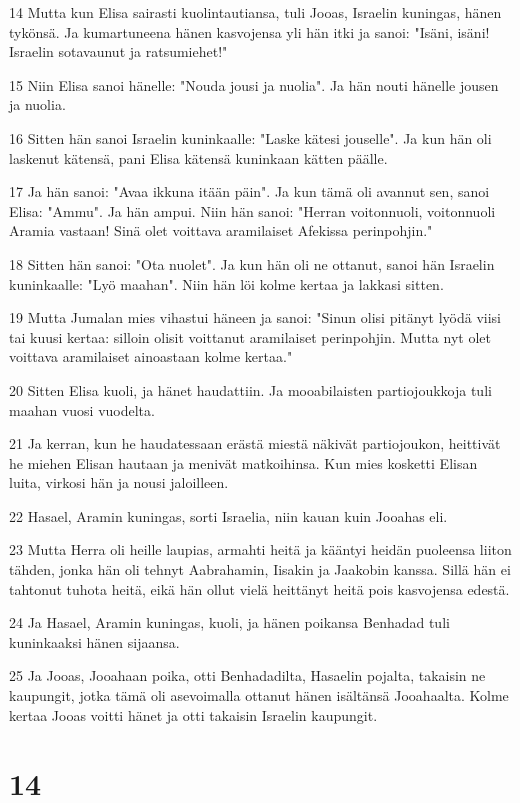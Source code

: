 \par 14 Mutta kun Elisa sairasti kuolintautiansa, tuli Jooas, Israelin kuningas, hänen tykönsä. Ja kumartuneena hänen kasvojensa yli hän itki ja sanoi: "Isäni, isäni! Israelin sotavaunut ja ratsumiehet!"
\par 15 Niin Elisa sanoi hänelle: "Nouda jousi ja nuolia". Ja hän nouti hänelle jousen ja nuolia.
\par 16 Sitten hän sanoi Israelin kuninkaalle: "Laske kätesi jouselle". Ja kun hän oli laskenut kätensä, pani Elisa kätensä kuninkaan kätten päälle.
\par 17 Ja hän sanoi: "Avaa ikkuna itään päin". Ja kun tämä oli avannut sen, sanoi Elisa: "Ammu". Ja hän ampui. Niin hän sanoi: "Herran voitonnuoli, voitonnuoli Aramia vastaan! Sinä olet voittava aramilaiset Afekissa perinpohjin."
\par 18 Sitten hän sanoi: "Ota nuolet". Ja kun hän oli ne ottanut, sanoi hän Israelin kuninkaalle: "Lyö maahan". Niin hän löi kolme kertaa ja lakkasi sitten.
\par 19 Mutta Jumalan mies vihastui häneen ja sanoi: "Sinun olisi pitänyt lyödä viisi tai kuusi kertaa: silloin olisit voittanut aramilaiset perinpohjin. Mutta nyt olet voittava aramilaiset ainoastaan kolme kertaa."
\par 20 Sitten Elisa kuoli, ja hänet haudattiin. Ja mooabilaisten partiojoukkoja tuli maahan vuosi vuodelta.
\par 21 Ja kerran, kun he haudatessaan erästä miestä näkivät partiojoukon, heittivät he miehen Elisan hautaan ja menivät matkoihinsa. Kun mies kosketti Elisan luita, virkosi hän ja nousi jaloilleen.
\par 22 Hasael, Aramin kuningas, sorti Israelia, niin kauan kuin Jooahas eli.
\par 23 Mutta Herra oli heille laupias, armahti heitä ja kääntyi heidän puoleensa liiton tähden, jonka hän oli tehnyt Aabrahamin, Iisakin ja Jaakobin kanssa. Sillä hän ei tahtonut tuhota heitä, eikä hän ollut vielä heittänyt heitä pois kasvojensa edestä.
\par 24 Ja Hasael, Aramin kuningas, kuoli, ja hänen poikansa Benhadad tuli kuninkaaksi hänen sijaansa.
\par 25 Ja Jooas, Jooahaan poika, otti Benhadadilta, Hasaelin pojalta, takaisin ne kaupungit, jotka tämä oli asevoimalla ottanut hänen isältänsä Jooahaalta. Kolme kertaa Jooas voitti hänet ja otti takaisin Israelin kaupungit.

\chapter{14}

